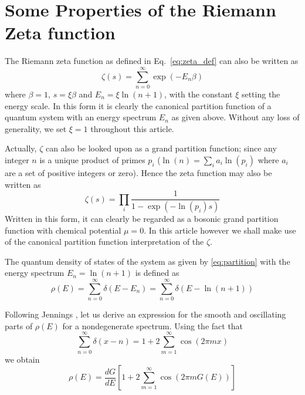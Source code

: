 \documentclass[11pt]{article}
\theoremstyle{plain}
\begin{document}
\section{Some Properties of the Riemann Zeta function}

The Riemann zeta function as defined in Eq.~\eqref{eq:zeta_def} can also be written as
\begin{equation}
\zeta(s) = \sum_{n=0}^{\infty} \exp(-E_n \beta)
\label{eq:partition}
\end{equation}
where $\beta = 1$, $s = \xi \beta$ and $E_n = \xi \ln(n + 1)$, with the constant $\xi$ setting the energy scale. In this form it is clearly the canonical partition function of a quantum system with an energy spectrum $E_n$ as given above. Without any loss of generality, we set $\xi = 1$ throughout this article.

Actually, $\zeta$ can also be looked upon as a grand partition function; since any integer $n$ is a unique product of primes $p_i$ ($\ln(n) = \sum_i a_i \ln(p_i)$ where $a_i$ are a set of positive integers or zero). Hence the zeta function may also be written as
\begin{equation}
\zeta(s) = \prod_i \frac{1}{1 - \exp(-\ln(p_i)s)}
\label{eq:grand_partition}
\end{equation}
Written in this form, it can clearly be regarded as a bosonic grand partition function with chemical potential $\mu = 0$. In this article however we shall make use of the canonical partition function interpretation of the $\zeta$.

The quantum density of states of the system as given by \eqref{eq:partition} with the energy spectrum $E_n = \ln(n+1)$ is defined as
\begin{equation}
\rho(E) = \sum_{n=0}^{\infty} \delta(E-E_n) = \sum_{n=0}^{\infty} \delta(E - \ln(n + 1))
\label{eq:density_def}
\end{equation}

Following Jennings \cite{jennings1974}, let us derive an expression for the smooth and oscillating parts of $\rho(E)$ for a nondegenerate spectrum. Using the fact that
\begin{equation}
\sum_{n=0}^{\infty} \delta(x - n) = 1 + 2 \sum_{m=1}^{\infty} \cos(2\pi mx)
\label{eq:delta_sum}
\end{equation}
we obtain
\begin{equation}
\rho(E) = \frac{dG}{dE} \left[ 1 + 2 \sum_{m=1}^{\infty} \cos(2\pi m G(E)) \right]
\label{eq:density_expansion}
\end{equation}
\end{document}
